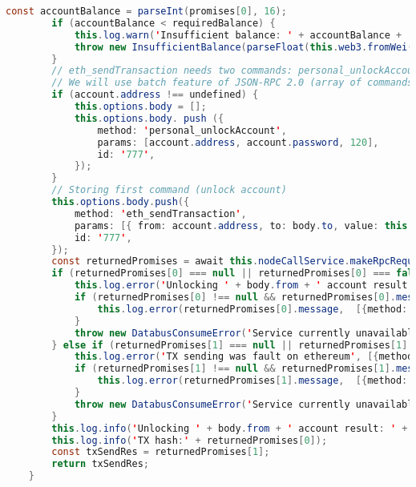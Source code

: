 \begin{lstlisting}[language=java]
		const accountBalance = parseInt(promises[0], 16);
		if (accountBalance < requiredBalance) {
			this.log.warn('Insufficient balance: ' + accountBalance + ', but need ' + requiredBalance);
			throw new InsufficientBalance(parseFloat(this.web3.fromWei(accountBalance, 'ether').toString()), account.name);
		}
		// eth_sendTransaction needs two commands: personal_unlockAccount and eth_sendTransaction. It must be executed one by one in a sequential order
		// We will use batch feature of JSON-RPC 2.0 (array of commands in body)
		if (account.address !== undefined) {
			this.options.body = [];
			this.options.body. push ({
				method: 'personal_unlockAccount',
				params: [account.address, account.password, 120],
				id: '777',
			});
		}
		// Storing first command (unlock account)
		this.options.body.push({
			method: 'eth_sendTransaction',
			params: [{ from: account.address, to: body.to, value: this.web3.toHex(weiValue), gas: this.web3.toHex(gasUsed)}],
			id: '777',
		});
		const returnedPromises = await this.nodeCallService.makeRpcRequest(this.options);
		if (returnedPromises[0] === null || returnedPromises[0] === false || returnedPromises[0].error !== undefined) {
			this.log.error('Unlocking ' + body.from + ' account result FALSE on ethereum', [{method: 'createTransaction'}]);
			if (returnedPromises[0] !== null && returnedPromises[0].message !== undefined) {
				this.log.error(returnedPromises[0].message,  [{method: 'createTransaction'}]);
			}
			throw new DatabusConsumeError('Service currently unavailable');
		} else if (returnedPromises[1] === null || returnedPromises[1].error !== undefined) {
			this.log.error('TX sending was fault on ethereum', [{method: 'createTransaction'}]);
			if (returnedPromises[1] !== null && returnedPromises[1].message !== undefined) {
				this.log.error(returnedPromises[1].message,  [{method: 'createTransaction'}]);
			}
			throw new DatabusConsumeError('Service currently unavailable');
		}
		this.log.info('Unlocking ' + body.from + ' account result: ' + returnedPromises[0]);
		this.log.info('TX hash:' + returnedPromises[0]);
		const txSendRes = returnedPromises[1];
		return txSendRes;
	}
	

\end{lstlisting}
